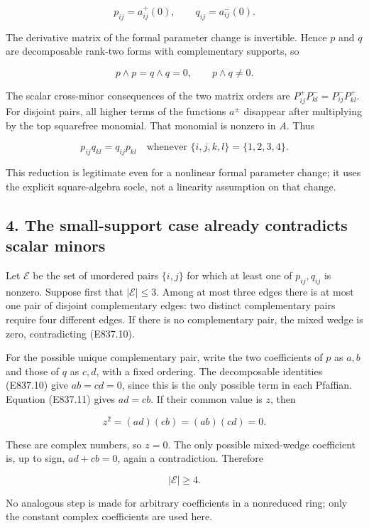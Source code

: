 \[
 p_{ij}=a^+_{ij}(0),\qquad q_{ij}=a^-_{ij}(0).
 \tag{E837.9}
\]

The derivative matrix of the formal parameter change is invertible.
Hence \(p\) and \(q\) are decomposable rank-two forms with complementary
supports, so

\[
 p\wedge p=q\wedge q=0,
 \qquad p\wedge q\ne0.
 \tag{E837.10}
\]

The scalar cross-minor consequences of the two matrix orders are
\(P^+_{ij}P^-_{kl}=P^-_{ij}P^+_{kl}\). For disjoint pairs, all higher
terms of the functions \(a^\pm\) disappear after multiplying by the top
squarefree monomial. That monomial is nonzero in \(A\). Thus

\[
 p_{ij}q_{kl}=q_{ij}p_{kl}
       \quad\text{whenever }\{i,j,k,l\}=\{1,2,3,4\}.
 \tag{E837.11}
\]

This reduction is legitimate even for a nonlinear formal parameter
change; it uses the explicit square-algebra socle, not a linearity
assumption on that change.

\subsection{4. The small-support case already contradicts scalar
minors}\label{SF-E837:the-small-support-case-already-contradicts-scalar-minors}

Let \(\mathcal E\) be the set of unordered pairs \(\{i,j\}\) for which
at least one of \(p_{ij},q_{ij}\) is nonzero. Suppose first that
\(|\mathcal E|\le3\). Among at most three edges there is at most one
pair of disjoint complementary edges: two distinct complementary pairs
require four different edges. If there is no complementary pair, the
mixed wedge is zero, contradicting (E837.10).

For the possible unique complementary pair, write the two coefficients
of \(p\) as \(a,b\) and those of \(q\) as \(c,d\), with a fixed
ordering. The decomposable identities (E837.10) give \(ab=cd=0\), since
this is the only possible term in each Pfaffian. Equation (E837.11)
gives \(ad=cb\). If their common value is \(z\), then

\[
 z^2=(ad)(cb)=(ab)(cd)=0.
 \tag{E837.12}
\]

These are complex numbers, so \(z=0\). The only possible mixed-wedge
coefficient is, up to sign, \(ad+cb=0\), again a contradiction.
Therefore

\[
 |\mathcal E|\ge4.
 \tag{E837.13}
\]

No analogous step is made for arbitrary coefficients in a nonreduced
ring; only the constant complex coefficients are used here.

